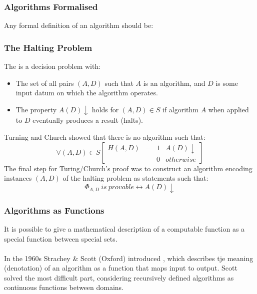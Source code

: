 \documentclass{report}
\begin{document}
\subsubsection*{Algorithms Formalised}
Any formal definition of an algorithm should be:
\begin{itemize}
\end{itemize}
\subsubsection*{The Halting Problem}
The  is a decision problem with:
\begin{itemize}
	\item The set of all pairs $(A,D)$ such that $A$ is an algorithm, and $D$ is some input datum on which the algorithm operates.
	\item The property $A(D)\downarrow$ holds for $(A,D) \in S$ if algorithm $A$ when applied to $D$ eventually produces a result (halts).
\end{itemize}
Turning and Church showed that there is no algorithm such that:
\[\forall (A,D) \in S \begin{bmatrix}
		H (A,D) & = & 1 & A(D)\downarrow \\
		        &   & 0 & otherwise
	\end{bmatrix}\]
The final step for Turing/Church's proof was to construct an algorithm encoding instances $(A,D)$ of the halting problem as statements such that:
\[\Phi_{A,D} \ is \ provable \leftrightarrow A(D)\downarrow\]

\subsubsection*{Algorithms as Functions}
It is possible to give a mathematical description of a computable function as a special function between special sets.
\\
\\ In the 1960s Strachey \& Scott (Oxford) introduced , which describes tje meaning (denotation)
of an algorithm as a function that maps input to output.
Scott solved the most difficult part, considering recursively defined algorithms as continuous functions between domains.
\end{document}
